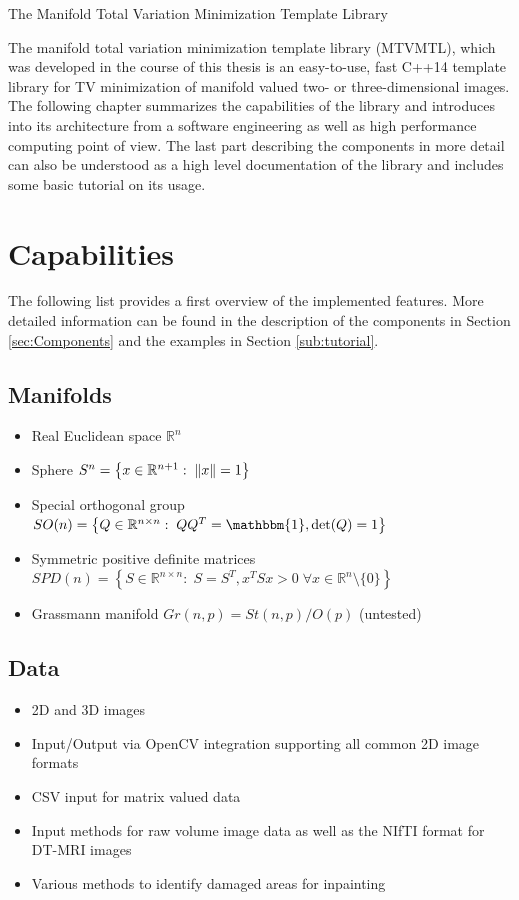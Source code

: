 \begin{chapter}{The Manifold Total Variation Minimization Template Library}
\label{ch:library}

The manifold total variation minimization template library (MTVMTL), which was developed in the course of this thesis is an easy-to-use, fast C++14 template library for TV minimization of manifold valued two- or three-dimensional images. \\

The following chapter summarizes the capabilities of the library
and introduces into its architecture from a software engineering as well as high performance computing point of view. The last part
describing the components in more detail can also be understood as a high level documentation of the library and includes some basic tutorial on its usage.


\section{Capabilities} %
\label{sec:Capabilities}
The following list provides a first overview of the implemented features. More detailed
information can be found in the description of the components in Section \ref{sec:Components}
and the examples in Section \ref{sub:tutorial}.
\subsection*{Manifolds} %
\label{sub:supportedManifolds}
\begin{itemize}
    \item Real Euclidean space $\mathbb{R}^n$
    \item Sphere $S^n=\left\lbrace x\in\mathbb{R}^{n+1}:\; \| x \|=1\right\rbrace$
    \item Special orthogonal group $SO(n)=\left\lbrace Q\in\mathbb{R}^{n\times n}:\; QQ^T=\mathbbm{1}, \operatorname{det}(Q)=1 \right\rbrace$
    \item Symmetric positive definite matrices $SPD(n)=\left\lbrace S\in\mathbb{R}^{n\times n}:\; S=S^T, x^TSx>0\; \forall x\in\mathbb{R}^n\setminus\lbrace 0\rbrace \right\rbrace$
    \item Grassmann manifold $Gr(n,p) = St(n,p) / O(p)$ (untested)
\end{itemize}

\subsection*{Data} %
\label{sub:Data}
\begin{itemize}
	\item 2D and 3D images
	\item Input/Output via OpenCV integration supporting all common 2D image formats
	\item CSV input for matrix valued data
	\item Input methods for raw volume image data as well as the NIfTI \cite{nifti} format for DT-MRI images
	\item Various methods to identify damaged areas for inpainting
\end{itemize}


\end{chapter}
